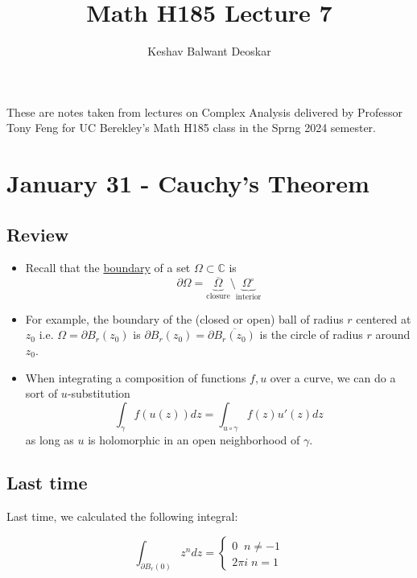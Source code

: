 \documentclass{article}
\title{Math H185 Lecture 7}
\author{Keshav Balwant Deoskar}
\newcommand{\C}{\mathbb{C}}
\begin{document}
\maketitle

These are notes taken from lectures on Complex Analysis delivered by Professor Tony Feng for UC Berekley's Math H185 class in the Sprng 2024 semester.

\tableofcontents

\pagebreak

\section{January 31 - Cauchy's Theorem}

\vskip 0.5cm
\subsection*{Review}

\vskip 0.5cm
\begin{itemize}
  \item Recall that the \underline{boundary} of a set $\Omega \subset \C$ is
  \[ \partial \Omega = \underbrace{\overline{\Omega}}_{\text{closure}} \setminus \underbrace{\Omega^{\circ}}_{\text{interior}} \]

  \item For example, the boundary of the (closed or open) ball of radius $r$ centered at $z_0$ i.e. $\Omega = \partial B_r(z_0)$ is $\partial B_r(z_0) = \partial \overline{B_r(z_0)}$ is the circle of radius $r$ around $z_0$.
  
  \item When integrating a composition of functions $f, u$ over a curve, we can do a sort of $u$-substitution 
  \[ \int_{\gamma} f(u(z)) dz = \int_{u \circ \gamma} f(z) u'(z) dz \] as long as $u$ is holomorphic in an open neighborhood of $\gamma$.
\end{itemize}

\vskip 1cm
\subsection{Last time}
Last time, we calculated the following integral:

\begin{mathdefinitionbox}{}
  \[ \int_{\partial B_r(0)} z^n dz = \begin{cases}
    0\;\;n \neq -1 \\
    2\pi i \; n = 1
  \end{cases}  \]
\end{mathdefinitionbox}
\end{document}
